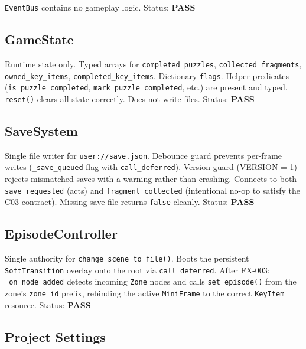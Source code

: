 \documentclass[12pt, a4paper]{article}
\newcommand{\statuspass}{\textcolor{passgre}{\textbf{PASS}}}
\begin{document}
\texttt{EventBus} contains no gameplay logic. Status: \statuspass

\subsection{GameState}

Runtime state only. Typed arrays for \texttt{completed\_puzzles},
\texttt{collected\_fragments}, \texttt{owned\_key\_items},
\texttt{completed\_key\_items}. Dictionary \texttt{flags}.
Helper predicates (\texttt{is\_puzzle\_completed}, \texttt{mark\_puzzle\_completed},
etc.) are present and typed. \texttt{reset()} clears all state correctly.
Does not write files. Status: \statuspass

\subsection{SaveSystem}

Single file writer for \texttt{user://save.json}. Debounce guard prevents
per-frame writes (\texttt{\_save\_queued} flag with \texttt{call\_deferred}).
Version guard (VERSION = 1) rejects mismatched saves with a warning rather
than crashing. Connects to both \texttt{save\_requested} (acts) and
\texttt{fragment\_collected} (intentional no-op to satisfy the C03 contract).
Missing save file returns \texttt{false} cleanly. Status: \statuspass

\subsection{EpisodeController}

Single authority for \texttt{change\_scene\_to\_file()}. Boots the persistent
\texttt{SoftTransition} overlay onto the root via \texttt{call\_deferred}.
After FX-003: \texttt{\_on\_node\_added} detects incoming \texttt{Zone} nodes
and calls \texttt{set\_episode()} from the zone's \texttt{zone\_id} prefix,
rebinding the active \texttt{MiniFrame} to the correct \texttt{KeyItem} resource.
Status: \statuspass

\subsection{Project Settings}
\end{document}
